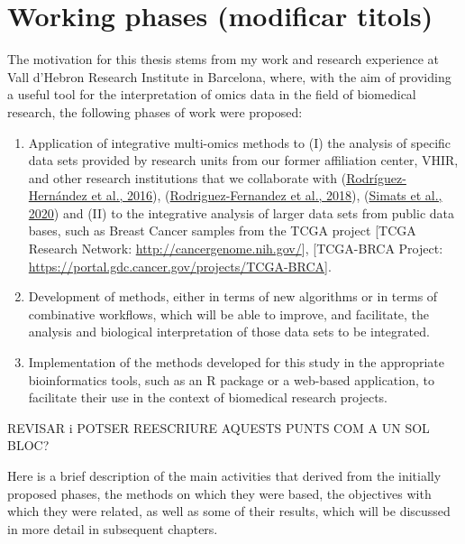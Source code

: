 \documentclass[a4paper, nobind]{templates/ociamthesis}
\renewcommand{\chaptermark}[1]{\markboth{\thechapter. #1}{\thechapter. #1}}
\begin{document}
\chaptermark{Objectives}

\minitoc 

\hypertarget{working-phases-modificar-titols}{%
\section{Working phases (modificar titols)}\label{working-phases-modificar-titols}}

The motivation for this thesis stems from my work and research experience at Vall d'Hebron Research Institute in Barcelona, where, with the aim of providing a useful tool for the interpretation of omics data in the field of biomedical research, the following phases of work were proposed:

\begin{enumerate}
\def\labelenumi{\arabic{enumi}.}
\item
  Application of integrative multi-omics methods to (I) the analysis of specific data sets provided by research units from our former affiliation center, VHIR, and other research institutions that we collaborate with (\protect\hyperlink{ref-rodriguez-hernandez_cinacalcet_2016}{Rodríguez-Hernández et al., 2016}), (\protect\hyperlink{ref-rodriguez-fernandez_phosphatidyl_2018}{Rodriguez-Fernandez et al., 2018}), (\protect\hyperlink{ref-simats_mouse_2020}{Simats et al., 2020}) and (II) to the integrative analysis of larger data sets from public data bases, such as Breast Cancer samples from the TCGA project {[}TCGA Research Network: \url{http://cancergenome.nih.gov/}{]}, {[}TCGA-BRCA Project: \url{https://portal.gdc.cancer.gov/projects/TCGA-BRCA}{]}.
\item
  Development of methods, either in terms of new algorithms or in terms of combinative workflows, which will be able to improve, and facilitate, the analysis and biological interpretation of those data sets to be integrated.
\item
  Implementation of the methods developed for this study in the appropriate bioinformatics tools, such as an R package or a web-based application, to facilitate their use in the context of biomedical research projects.
\end{enumerate}

REVISAR i POTSER REESCRIURE AQUESTS PUNTS COM A UN SOL BLOC?

Here is a brief description of the main activities that derived from the initially proposed phases, the methods on which they were based, the objectives with which they were related, as well as some of their results, which will be discussed in more detail in subsequent chapters.
\end{document}
